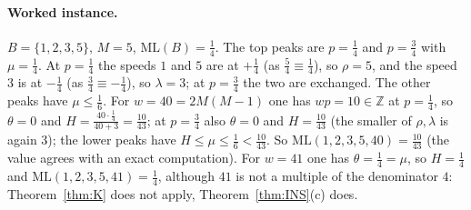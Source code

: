 \documentclass[11pt]{article}
\theoremstyle{definition}
\theoremstyle{remark}
\newcommand{\ML}{\mathrm{ML}}
\newcommand{\ZZ}{\mathbb{Z}}
\begin{document}
\paragraph{Worked instance.}
$B=\{1,2,3,5\}$, $M=5$, $\ML(B)=\frac14$. The top peaks are $p=\frac14$ and $p=\frac34$ with $\mu=\frac14$. At $p=\frac14$ the speeds $1$ and $5$ are at $+\frac14$ (as $\frac54\equiv\frac14$), so $\rho=5$, and the speed $3$ is at $-\frac14$ (as $\frac34\equiv-\frac14$), so $\lambda=3$; at $p=\frac34$ the two are exchanged. The other peaks have $\mu\le\frac16$. For $w=40=2M(M-1)$ one has $wp=10\in\ZZ$ at $p=\frac14$, so $\theta=0$ and $H=\frac{40\cdot\frac14}{40+3}=\frac{10}{43}$; at $p=\frac34$ also $\theta=0$ and $H=\frac{10}{43}$ (the smaller of $\rho,\lambda$ is again $3$); the lower peaks have $H\le\mu\le\frac16<\frac{10}{43}$. So $\ML(1,2,3,5,40)=\frac{10}{43}$ (the value agrees with an exact computation). For $w=41$ one has $\theta=\frac14=\mu$, so $H=\frac14$ and $\ML(1,2,3,5,41)=\frac14$, although $41$ is not a multiple of the denominator $4$: Theorem~\ref{thm:K} does not apply, Theorem~\ref{thm:INS}(c) does.
\end{document}

